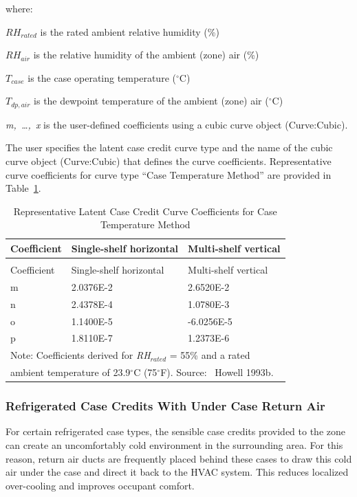 where:

\(R{H_{rated}}\) is the rated ambient relative humidity (\%)

\(R{H_{air}}\) is the relative humidity of the ambient (zone) air (\%)

\({T_{case}}\) is the case operating temperature (\(^{\circ}\)C)

\({T_{dp,air}}\) is the dewpoint temperature of the ambient (zone) air (\(^{\circ}\)C)

\emph{m,~\ldots{},~x} is the user-defined coefficients using a cubic curve object (Curve:Cubic).

The user specifies the latent case credit curve type and the name of the cubic curve object (Curve:Cubic) that defines the curve coefficients. Representative curve coefficients for curve type ``Case Temperature Method'' are provided in Table~\ref{table:representative-latent-case-credit-curve}.

\begin{longtable}[c]{p{1.5in}p{2.36in}p{2.13in}}
\caption{Representative Latent Case Credit Curve Coefficients for Case Temperature Method \label{table:representative-latent-case-credit-curve}} \tabularnewline
\toprule
Coefficient & Single-shelf horizontal & Multi-shelf vertical \tabularnewline
\midrule
\endfirsthead

\caption{Representative Latent Case Credit Curve Coefficients for Case Temperature Method} \tabularnewline
\toprule
Coefficient & Single-shelf horizontal & Multi-shelf vertical \tabularnewline
\midrule
\endhead

m & 2.0376E-2 & 2.6520E-2 \tabularnewline
n & 2.4378E-4 & 1.0780E-3 \tabularnewline
o & 1.1400E-5 & -6.0256E-5 \tabularnewline
p & 1.8110E-7 & 1.2373E-6 \tabularnewline
\midrule
\multicolumn{3}{l}{Note: Coefficients derived for \emph{RH\(_{rated}\)} = 55\% and a rated} \tabularnewline
\multicolumn{3}{l}{ambient temperature of 23.9\(^{\circ}\)C (75\(^{\circ}\)F). Source:~ Howell 1993b.} \tabularnewline
\bottomrule
\end{longtable}

\subsubsection{Refrigerated Case Credits With Under Case Return Air}\label{refrigerated-case-credits-with-under-case-return-air}

For certain refrigerated case types, the sensible case credits provided to the zone can create an uncomfortably cold environment in the surrounding area. For this reason, return air ducts are frequently placed behind these cases to draw this cold air under the case and direct it back to the HVAC system. This reduces localized over-cooling and improves occupant comfort.

